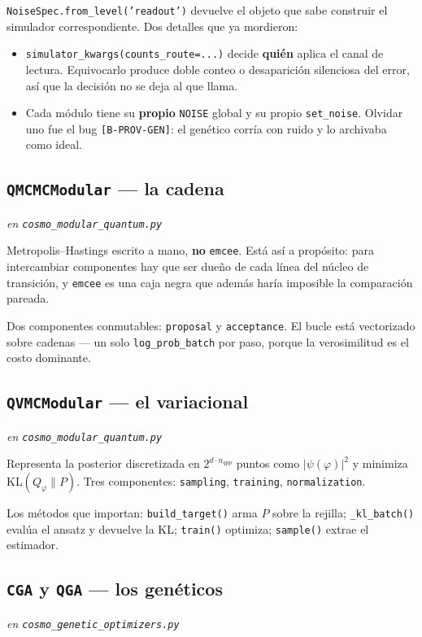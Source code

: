 \documentclass[11pt,a4paper]{article}
\newcommand{\M}[1]{\texttt{#1}}
\begin{document}
\M{NoiseSpec.from\_level('readout')} devuelve el objeto que sabe construir
el simulador correspondiente. Dos detalles que ya mordieron:

\begin{itemize}[leftmargin=1.6em]
  \item \M{simulator\_kwargs(counts\_route=...)} decide \textbf{quién}
    aplica el canal de lectura. Equivocarlo produce doble conteo o
    desaparición silenciosa del error, así que la decisión no se deja al
    que llama.
  \item Cada módulo tiene su \textbf{propio} \M{NOISE} global y su propio
    \M{set\_noise}. Olvidar uno fue el bug \M{[B-PROV-GEN]}: el genético
    corría con ruido y lo archivaba como ideal.
\end{itemize}

\subsection{\M{QMCMCModular} — la cadena}
\emph{en \M{cosmo\_modular\_quantum.py}}

Metropolis--Hastings escrito a mano, \textbf{no} \M{emcee}. Está así a
propósito: para intercambiar componentes hay que ser dueño de cada línea
del núcleo de transición, y \M{emcee} es una caja negra que además haría
imposible la comparación pareada.

Dos componentes conmutables: \M{proposal} y \M{acceptance}. El bucle está
vectorizado sobre cadenas — un solo \M{log\_prob\_batch} por paso, porque
la verosimilitud es el costo dominante.

\subsection{\M{QVMCModular} — el variacional}
\emph{en \M{cosmo\_modular\_quantum.py}}

Representa la posterior discretizada en $2^{d\cdot n_{qpp}}$ puntos como
$|\psi(\varphi)|^2$ y minimiza $\mathrm{KL}(Q_\varphi\|P)$. Tres
componentes: \M{sampling}, \M{training}, \M{normalization}.

Los métodos que importan: \M{build\_target()} arma $P$ sobre la rejilla;
\M{\_kl\_batch()} evalúa el ansatz y devuelve la KL; \M{train()} optimiza;
\M{sample()} extrae el estimador.

\subsection{\M{CGA} y \M{QGA} — los genéticos}
\emph{en \M{cosmo\_genetic\_optimizers.py}}
\end{document}
